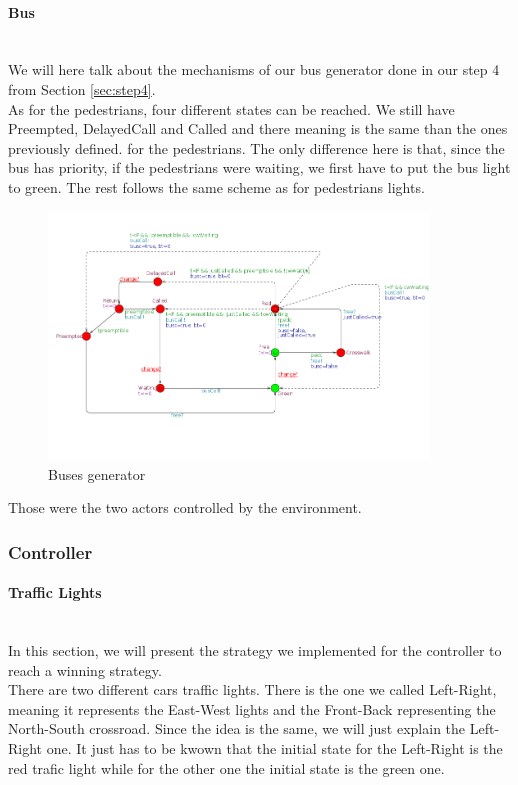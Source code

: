 \paragraph{Bus} \mbox{}\\
We will here talk about the mechanisms of our bus generator done in our step 4 from Section \ref{sec:step4}. \\
As for the pedestrians, four different states can be reached. We still have Preempted, DelayedCall and Called and there meaning is the same than the ones previously defined. for the pedestrians. The only difference here is that, since the bus has priority, if the pedestrians were waiting, we first have to put the bus light to green. The rest follows the same scheme as for pedestrians lights.

\begin{figure}[H]\label{fig:bus}
  \centering
    \includegraphics[width=0.9\textwidth]{picture/bus.png}
    \caption{Buses generator}
\end{figure}

\noindent Those were the two actors controlled by the environment.

\subsubsection{Controller}
\paragraph{Traffic Lights} \mbox{}\\

In this section, we will present the strategy we implemented for the controller to reach a winning strategy. \\

There are two different cars traffic lights. There is the one we called Left-Right, meaning it represents the East-West lights and the Front-Back representing the North-South crossroad. Since the idea is the same, we will just explain the Left-Right one. It just has to be kwown that the initial state for the Left-Right is the red trafic light while for the other one the initial state is the green one. \\

